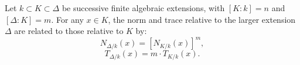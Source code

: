 Let $k \subset K \subset \Delta$ be successive finite algebraic extensions, with $[K:k] = n$ and $[\Delta:K] = m$. For any $x \in K$, the norm and trace relative to the larger extension $\Delta$ are related to those relative to $K$ by:
$$N_{\Delta/k}(x) = [N_{K/k}(x)]^m,$$
$$T_{\Delta/k}(x) = m \cdot T_{K/k}(x).$$
